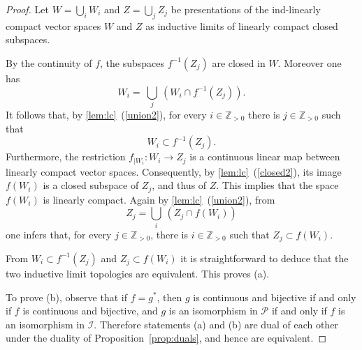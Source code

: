 \documentclass[12pt,reqno]{amsart}
\theoremstyle{definition}
\theoremstyle{remark}
\begin{document}
	\begin{proof}
		
		Let $W = \bigcup_i W_i$ and $Z = \bigcup_j Z_j$ be presentations of the ind-linearly compact vector spaces $W$ and $Z$ as inductive limits of linearly compact closed subspaces.
		
		By the continuity of $f$, the subspaces $f^{-1}(Z_j)$ are closed in $W$. Moreover one has 
		$$
		W_i = \ \bigcup_j \ (W_i \cap f^{-1}(Z_j)).
		$$
		It follows that, by \ref{lem:lc}~(\ref{union2}), for every $i\in\mathbb{Z}_{>0}$ there is $j\in\mathbb{Z}_{>0}$ such that
		$$
		W_i \subset f^{-1}(Z_j).
		$$
		Furthermore, the restriction $f_{|W_i}: W_i \rightarrow Z_j$ is a continuous linear map between linearly compact vector spaces. Consequently, by \ref{lem:lc}~(\ref{closed2}), its image $f(W_i)$ is a closed subspace of $Z_j$, and thus of $Z$. This implies that the space $f(W_i)$ is linearly compact. Again by \ref{lem:lc}~(\ref{union2}), from 
		$$
		Z_j = \bigcup_i \ (Z_j \cap f(W_i))
		$$
		one infers that, for every $j\in\mathbb{Z}_{>0}$, there is $i\in\mathbb{Z}_{>0}$ such that $Z_j \subset f(W_i)$.
		
		From $W_i \subset f^{-1}(Z_j)$ and $Z_j \subset f(W_i)$ it is straightforward to deduce that the two inductive limit topologies are equivalent. This proves (a).
		
		To prove (b), observe that if $f = g^\ast$, then $g$ is continuous and bijective if and only if $f$ is continuous and bijective, and $g$ is an isomorphism in $\mathcal{P}$ if and only if $f$ is an isomorphism in $\mathcal{I}$. Therefore statements (a) and (b) are dual of each other under the duality of Proposition~\ref{prop:duals}, and hence are equivalent.
	\end{proof}
	
\end{document}
